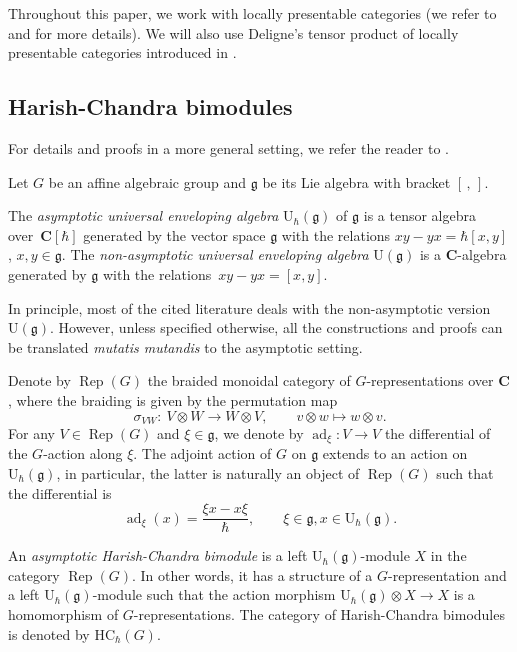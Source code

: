 \documentclass[10pt,a4paper]{article}
\numberwithin{equation}{section}
\newcommand{\C}{\mathbf{C}}
\newcommand{\U}{\mathrm{U}_{\hbar}}
\newcommand{\g}{\mathfrak{g}}
\DeclareMathOperator{\ad}{ad}
\newcommand{\HC}{\mathrm{HC}_{\hbar}}
\DeclareMathOperator{\Rep}{Rep}
\begin{document}
Throughout this paper, we work with locally presentable categories (we refer to \cite{AdamekRosicky} and \cite[Section 2]{BCJF} for more details). We will also use Deligne's tensor product of locally presentable categories introduced in \cite{Deligne}.
	
	
	\subsection{Harish-Chandra bimodules}
	\label{subsect::hc_bimod}
	For details and proofs in a more general setting, we refer the reader to \cite[Section 2]{KalmykovSafronov}.
	
	Let $G$ be an affine algebraic group and $\g$ be its Lie algebra with bracket $[\,,\,]$.
	
	\begin{Definition}
		\label{def::asympt_uea}
		The \emph{asymptotic universal enveloping algebra} $\U(\g)$ of $\g$ is a tensor algebra over~$\C[\hbar]$ generated by the vector space $\g$ with the relations
$
		xy - yx = \hbar [x,y]$, $ x,y\in \g$.
		The \emph{non-asymptotic universal enveloping algebra} $\mathrm{U}(\g)$ is a $\C$-algebra generated by $\g$ with the relations~${xy - yx = [x,y]}$.
	\end{Definition}
	
	\begin{Remark}
		In principle, most of the cited literature deals with the non-asymptotic version~$\mathrm{U}(\g)$. However, unless specified otherwise, all the constructions and proofs can be translated \emph{mutatis mutandis} to the asymptotic setting.
	\end{Remark}
	
	Denote by $\Rep(G)$ the braided monoidal category of $G$-representations over $\C$, where the braiding is given by the permutation map
	\[
	\sigma_{VW} \colon\ V \otimes W \rightarrow W \otimes V, \qquad v\otimes w \mapsto w \otimes v.
	\]
	For any $V \in \Rep(G)$ and $\xi\in \g$, we denote by $\ad_{\xi} \colon V \rightarrow V$ the differential of the $G$-action along $\xi$. The adjoint action of $G$ on $\g$ extends to an action on $\U(\g)$, in particular, the latter is naturally an object of $\Rep(G)$ such that the differential is
	\begin{equation*}
		\ad_{\xi}(x) = \frac{\xi x - x \xi}{\hbar},\qquad \xi\in \g, x\in \U(\g).
	\end{equation*}
	
	\begin{Definition}
		An \emph{asymptotic Harish-Chandra bimodule} is a left $\U(\g)$-module $X$ in the category $\Rep(G)$. In other words, it has a structure of a $G$-representation and a left $\U(\g)$-module such that the action morphism
		$
		\U(\g) \otimes X \rightarrow X
		$
		is a homomorphism of $G$-representations. The category of Harish-Chandra bimodules is denoted by $\HC(G)$.
	\end{Definition}
	
\end{document}
